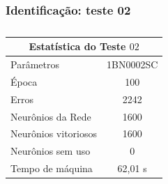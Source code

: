 \documentclass[aspectratio=10]{beamer} %
\begin{document}
\begin{frame}
	\frametitle{Identificação: teste 02}
\begin{table}[H]
	\centering
	\caption{}
	\label{Estatistica do teste $02$}
	\begin{tabular}{@{}lc@{}}
		\toprule
		\multicolumn{2}{c}{Estatística do Teste $02$}         \\ \midrule
		Parâmetros                  & 1BN0002SC \\
		Época                       & 100       \\
		Erros                       & 2242       \\
		Neurônios da Rede           & 1600       \\
		Neurônios vitoriosos        & 1600       \\
		Neurônios sem uso           & 0         \\
		Tempo de máquina            & 62,01 s   \\ \bottomrule
	\end{tabular}
\end{table} 
\end{frame}
\end{document}
